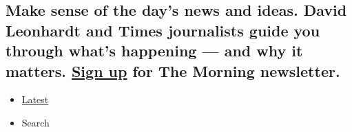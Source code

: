 \hypertarget{make-sense-of-the-days-news-and-ideas-david-leonhardt-and-times-journalists-guide-you-through-whats-happening--and-why-it-matters-sign-up-for-the-morning-newsletter-1}{%
\subsection{\texorpdfstring{Make sense of the day's news and ideas.
David Leonhardt and Times journalists guide you through what's happening
--- and why it matters.
\href{https://www.nytimes.com/newsletters/morning-briefing}{Sign up} for
The Morning
newsletter.}{Make sense of the day's news and ideas. David Leonhardt and Times journalists guide you through what's happening --- and why it matters. Sign up for The Morning newsletter.}}\label{make-sense-of-the-days-news-and-ideas-david-leonhardt-and-times-journalists-guide-you-through-whats-happening--and-why-it-matters-sign-up-for-the-morning-newsletter-1}}

\begin{itemize}
\tightlist
\item
  \protect\hyperlink{stream-panel}{Latest}
\item
  Search
\end{itemize}

